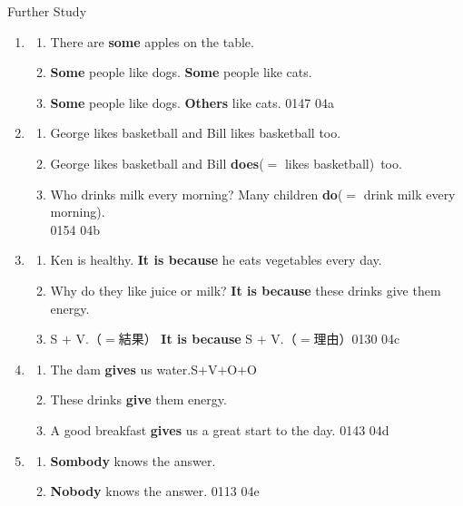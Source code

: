 \documentclass[aspectratio=169,xcolor={dvipsnames,table}]{beamer}
\begin{document}
\begin{frame}[plain]{Further Study}

\hypertarget{kaisetsu}{}
\begin{enumerate}
 \item \begin{enumerate}
        \item There are \textbf{some} apples on the table.
        \item \textbf{Some} people like dogs. \textbf{Some} people like cats.
	\item \textbf{Some} people like dogs. \textbf{Others} like cats.%
\hfill{\tiny 0147}\,{\scriptsize {}\,04a}
        \end{enumerate} 
 \item \begin{enumerate}
	\item George likes basketball and Bill likes basketball too.
	\item George likes basketball and Bill \textbf{does}($=$ likes basketball)\,\,\,too.
	\item Who drinks milk every morning? Many children \textbf{do}($=$ drink milk every morning).\\
\hfill{\tiny 0154}\,{\scriptsize {}\,04b}

       \end{enumerate}
 \item \begin{enumerate}
	\item Ken is healthy. \textbf{It is because} he eats vegetables every day.%
	\item Why do they like juice or milk? \textbf{It is because} these drinks give them energy.
	\item S $+$ V.（$=$結果）\hspace{10pt} \textbf{It is because} S $+$ V.（$=$理由）\hfill{\tiny 0130}\,{\scriptsize {}\,04c}
       \end{enumerate}
 \item \begin{enumerate}
	\item The dam \textbf{gives} us water.\hfill{}S$+$V$+$O$+$O
	\item These drinks \textbf{give} them energy.
	\item A good breakfast \textbf{gives} us a great start to the day.%
\hfill{\tiny 0143}\,{\scriptsize {}\,04d}
       \end{enumerate}
 \item \begin{enumerate}
	\item \textbf{Sombody} knows the answer.
	\item \textbf{Nobody} knows the answer.%
\hfill{\tiny 0113}\,{\scriptsize {}\,04e}

       \end{enumerate}
\end{enumerate}

\end{frame}
\end{document}
